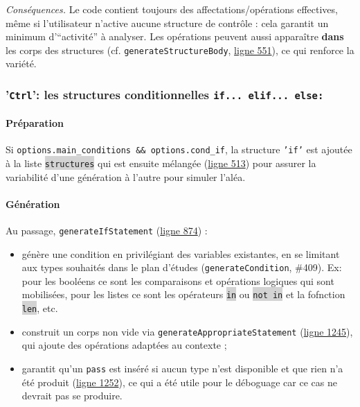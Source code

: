 \documentclass[11pt,a4paper]{article}
\newcommand{\code}[1]{\colorbox{lightgray}{\texttt{\small #1}}}
\begin{document}
\emph{Conséquences.} Le code contient toujours des affectations/opérations effectives, même si l’utilisateur n’active aucune structure de contrôle : cela garantit un minimum d’``activité'' à analyser. Les opérations peuvent aussi apparaître \textbf{dans} les corps des structures (cf. \texttt{generateStructureBody}, \href{https://github.com/edu-mateescoj/gyminf/blob/main/static/js/code-generator.js#L1083}{ligne 551}), ce qui renforce la variété.



\subsubsection{'\texttt{Ctrl}': les structures conditionnelles \texttt{if... elif... else:}}

\paragraph{Préparation} Si \texttt{options.main\_conditions \&\& options.cond\_if}, la structure \texttt{'if'} est ajoutée à la liste \code{structures} qui est ensuite mélangée (\href{https://github.com/edu-mateescoj/gyminf/blob/main/static/js/code-generator.js#L1083}{ligne 513}) pour assurer la variabilité d'une génération à l'autre pour simuler l'aléa.


\paragraph{Génération} Au passage, \texttt{generateIfStatement} (\href{https://github.com/edu-mateescoj/gyminf/blob/main/static/js/code-generator.js#L1083}{ligne 874}) :
\begin{itemize}
  \item génère une condition en privilégiant des variables existantes, en se limitant aux types souhaités dans le plan d'études (\texttt{generateCondition}, \#409). Ex: pour les booléens ce sont les comparaisons et opérations logiques qui sont mobilisées, pour les listes ce sont les opérateurs \code{in} ou \code{not in} et la fofnction \code{len}, etc.
  \item construit un corps non vide via \texttt{generateAppropriateStatement} (\href{https://github.com/edu-mateescoj/gyminf/blob/main/static/js/code-generator.js#L1083}{ligne 1245}), qui ajoute des opérations adaptées au contexte ;
  \item garantit qu’un \texttt{pass} est inséré si aucun type n'est disponible et que rien n’a été produit (\href{https://github.com/edu-mateescoj/gyminf/blob/main/static/js/code-generator.js#L1083}{ligne 1252}), ce qui a été utile pour le déboguage car ce cas ne devrait pas se produire.
\end{itemize}
\end{document}
